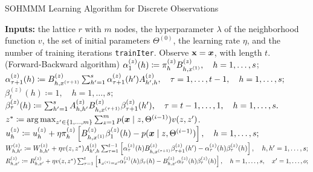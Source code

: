 \begin{algorithm}
	\caption{SOHMMM Learning Algorithm for Discrete Observations \cite{Ferles2008}}
	\label{alg:sohmmm_discrete}
	
	\begin{algorithmic}[1]
		\State \textbf{Inputs:} the lattice $r$ with $m$ nodes, the hyperparameter $\lambda$ of the neighborhood function $v$, the set of initial parameters $\Theta^{(0)}$, the learning rate $\eta$, and the number of training iterations \texttt{trainIter}.
		\vspace{0.3cm}
		\vspace{0.3cm}
		\State Observe ${\mathbf{x}} = {\bm{x}}$, with length $t$.
		\vspace{0.3cm}
		 $\quad$(Forward-Backward algorithm)
		\vspace{0.3cm}
		\State $ \alpha_1^{(z)}(h) \coloneqq \pi_{h}^{(z)}{B}^{(z)}_{h,x^{(1)}}, \quad h = 1, \dots, s$;
		\vspace{0.3cm}
		\State $ \alpha_{\tau+1}^{(z)}(h) \coloneqq {B}^{(z)}_{h,x^{(\tau+1)}} \sum_{h'=1}^{s}\alpha_{\tau+1}^{(z)}(h'){A}^{(z)}_{h',h}, \quad \tau = 1, \dots, t-1, \quad h = 1, \dots, s;$
		\vspace{0.3cm}
		\State $ \beta_{t}^{(z)}(h) \coloneqq 1, \quad h = 1, \dots, s;$
		\vspace{0.3cm}
		\State $ \beta_{\tau}^{(z)}(h) \coloneqq \sum_{h'=1}^{s}{A}^{(z)}_{h,h'}{B}^{(z)}_{h,x^{(\tau+1)}}\beta_{\tau+1}^{(z)}(h'), \quad \tau = t-1, \dots,  1, \quad h = 1, \dots, s. $
		\vspace{0.3cm}
		\EndFor
		\vspace{0.3cm}
		\State $z^* \coloneqq  \operatorname*{arg\,max}_{z' \in \{1,\dots,m\}} \sum_{z=1}^m p({\bm{x}} \mid z, \Theta^{(i-1)})v(z, z')$.
		\vspace{0.3cm}
		\vspace{0.3cm}
		\State $ {u}_h^{(z)} \coloneqq {u}_h^{(z)} + \eta  {\pi}_h^{(z)} \left[ {B}^{(z)}_{h,x^{(1)}} \beta_{1}^{(z)}(h) - p({\bm{x}} \mid z, \Theta^{(i-1)}) \right], \quad h = 1, \dots, s;$
		\vspace{0.3cm}
		\State $ {W}^{(z)}_{h,h'} \coloneqq  {W}^{(z)}_{h,h'} + \eta v(z,z^*) {A}^{(z)}_{h',h}\sum_{\tau=1}^{t-1}\left[\alpha_{\tau}^{(z)}(h) {B}^{(z)}_{h,x^{(\tau+1)}}\beta_{\tau+1}^{(z)}(h') - \alpha_{\tau}^{(z)}(h)\beta_{\tau}^{(z)}(h) \right], \quad h,h' = 1, \dots, s; $
		\vspace{0.3cm}
		\State $ {R}^{(z)}_{h,x'} \coloneqq {R}^{(z)}_{h,x'} + \eta v(z,z^*) \sum_{\tau=1}^{t}\left[\bm{1}_{x^{(\tau)}=x'}\alpha_{\tau}^{(z)}(h)\beta_{\tau}(h) - {B}^{(z)}_{h,x'}\alpha_{\tau}^{(z)}(h)\beta_{\tau}^{(z)}(h) \right], \quad h = 1, \dots, s, \quad x' = 1,\dots,o;$

\end{algorithmic}
\end{algorithm}

